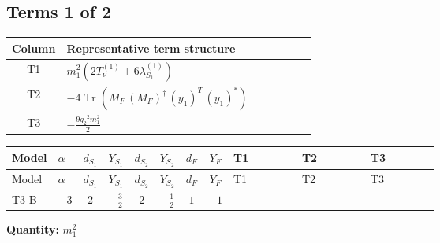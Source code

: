 \documentclass[8pt]{article}
\begin{document}
\begin{landscape}
\subsection*{Terms 1 of 2}
\begin{center}
\begin{tabular}{@{}c >{\raggedright\arraybackslash}p{0.82\linewidth}@{}}
\toprule
Column & Representative term structure \\
\midrule
T1 & \(\displaystyle {m_1^2} (2 T_{\nu}^{(1)}+6 {\lambda_{S_1}^{(1)}})\) \\
\midrule
T2 & \(\displaystyle -4 \operatorname{Tr}\!\left({M_F}\,\left({M_F}\right)^{\dagger}\,\left({y_1}\right)^{T}\,\left({y_1}\right)^{*}\right)\) \\
\midrule
T3 & \(\displaystyle -\frac{9 {g_2}^2 {m_1^2}}{2}\) \\
\midrule
\bottomrule
\end{tabular}
\end{center}
\smallskip
\tiny
\begin{longtable}{@{}llcccccc >{\raggedright\arraybackslash}p{0.21\linewidth} >{\raggedright\arraybackslash}p{0.21\linewidth} >{\raggedright\arraybackslash}p{0.21\linewidth}@{}}
\toprule
Model & $\alpha$ & $d_{S_1}$ & $Y_{S_1}$ & $d_{S_2}$ & $Y_{S_2}$ & $d_F$ & $Y_F$ & T1 & T2 & T3 \\
\midrule
\endfirsthead
\toprule
Model & $\alpha$ & $d_{S_1}$ & $Y_{S_1}$ & $d_{S_2}$ & $Y_{S_2}$ & $d_F$ & $Y_F$ & T1 & T2 & T3 \\
\midrule
\endhead
T3-B & $-3$ & $2$ & $-\frac{3}{2}$ & $2$ & $-\frac{1}{2}$ & $1$ & $-1$ & \scriptsize\adjustbox{max width=\linewidth}{$\begin{gathered} {m_1^2} (2 T_{\nu}^{(1)}+6 {\lambda_{S_1}^{(1)}})\end{gathered}$} & \scriptsize\adjustbox{max width=\linewidth}{$\begin{gathered} -4 \operatorname{Tr}\!\left({M_F}\,\left({M_F}\right)^{\dagger}\,\left({y_1}\right)^{T}\,\left({y_1}\right)^{*}\right)\end{gathered}$} & \scriptsize\adjustbox{max width=\linewidth}{$\begin{gathered} -\frac{9 {g_2}^2 {m_1^2}}{2}\end{gathered}$} \\
\midrule
\bottomrule
\end{longtable}
\clearpage
\noindent\textbf{Quantity: }$m_1^2$\par\smallskip

\end{landscape}
\end{document}
